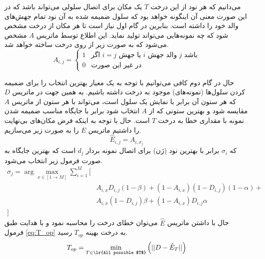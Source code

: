 می‌دانیم که هر نود از این درخت $T$ یک مکان برای اتصال سلولی می‌تواند باشد که در این صورت معنی آن اینگونه خواهد بود که سلول ضمیمه شده به آن نود تمام جهش‌های والد خود را داشته است. بنابرین در گام اول نیاز است تا هر مکان از درخت مشخص شود که چه نمونه‌هایی می‌تواند تولید نماید. این اطلاع توسط ماتریس $A$ مشخص می‌شود که به صورت زیر از روی درخت ساخته خواهد شد.
\begin{equation}
	A_{i,j} = 
	\begin{cases}
		1 & \text{اگر $i=j$ یا جهش $i$ والد جهش $j$ باشد}\\
		0 & \text{در غیر این صورت}
	\end{cases}
\end{equation}

حال در گام دوم کافی می‌توانیم با توجه به یک معیار بهترین انتخاب را برای ضمیمه کردن سلول‌ها (نمونه‌های) موجود به درخت داشته باشیم. به همین جهت در ماتریس $D$ که هر ستون آن برابر با نمایش یک سلول است، می‌تواند با هر ستون از ماتریس $A$ مقایسه شود و بهترین ستونی که از $A$ انتخاب شود برابر با جایگاه مناسب ضمیمه شدن نمونه با مقداری خطا به درخت $T$ است. حال با توجه به اینکه فرض مکان‌های بی‌نهایت را داشتیم ماتریس $E$ را به صورت زیر می‌سازیم.
\begin{equation}
	\hat{E}_{i,j} = A_{i, \sigma_j}
\end{equation}
که $\sigma_i$ برابر با بهترین نود (ژن) برای اتصال نمونه  بردار $d_j$ است که بهترین جایگاه به صورت فرمول زیر انتخاب می‌شود.
\begin{equation}
	\begin{aligned}
		\sigma_j = \arg\max_{x\in[1 \to M]}  \sum_{i=1}^M\Big[& \\
		&A_{i,x}D_{i,j}(1-\beta) + (1-A_{i,x})(1-D_{i,j})(1-\alpha) + \\
		&A_{i,x}(1-D_{i,j})\beta + (1-A_{i,x})D_{i,j}\alpha \\
		\Big]& 
	\end{aligned}
\end{equation}
حال با داشتن ماتریس $\hat{E}$ می‌توان خطای درخت را محاسبه نمود و با هدایت  طبق فرمول \ref{eq:T_op} به درخت بهینه $T_{op}$ رسید.
\begin{equation}
	T_{op} = \min_{T\in \text{\lr{All possible $T$}}}\Big({||D-\hat{E}_T||}\Big)
	\label{eq:T_op}
\end{equation}




